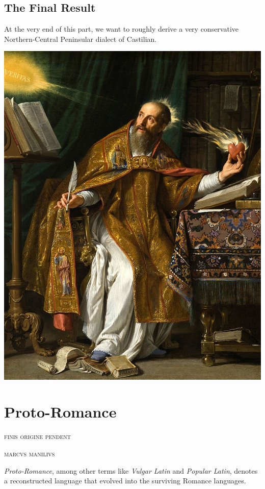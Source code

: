 \documentclass{report}[12pt]
\begin{document}
\section{The Final Result}

At the very end of this part, we want to roughly derive a very conservative Northern-Central Peninsular dialect of Castilian.

\pagebreak

\includegraphics[scale=0.5]{augustine.jpg}
\thispagestyle{empty}

\pagebreak

\chapter{Proto-Romance}

\epigraph{\textsc{finis origine pendent}}{\textsc{marcvs manilivs}}

\emph{Proto-Romance}, among other terms like \emph{Vulgar Latin} and \emph{Popular Latin}, denotes a reconstructed language that evolved into the surviving Romance languages. 
\end{document}
